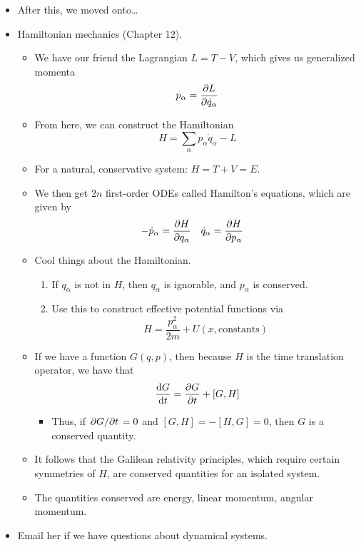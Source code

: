 \documentclass[../notes.tex]{subfiles}
\begin{document}
\begin{itemize}
\begin{itemize}
    \end{itemize}
    \item After this, we moved onto\dots
    \item Hamiltonian mechanics (Chapter 12).
    \begin{itemize}
        \item We have our friend the Lagrangian $L=T-V$, which gives us generalized momenta
        \begin{equation*}
            p_\alpha = \pdv{L}{\dot{q}_\alpha}
        \end{equation*}
        \item From here, we can construct the Hamiltonian
        \begin{equation*}
            H = \sum_\alpha p_\alpha\dot{q}_\alpha-L
        \end{equation*}
        \item For a natural, conservative system: $H=T+V=E$.
        \item We then get $2n$ first-order ODEs called Hamilton's equations, which are given by
        \begin{align*}
            -\dot{p}_\alpha &= \pdv{H}{q_\alpha}&
            \dot{q}_\alpha &= \pdv{H}{p_\alpha}
        \end{align*}
        \item Cool things about the Hamiltonian.
        \begin{enumerate}
            \item If $q_\alpha$ is not in $H$, then $q_\alpha$ is ignorable, and $p_\alpha$ is conserved.
            \item Use this to construct effective potential functions via
            \begin{equation*}
                H = \frac{p_\alpha^2}{2m}+U(x,\text{constants})
            \end{equation*}
        \end{enumerate}
        \item If we have a function $G(q,p)$, then because $H$ is the time translation operator, we have that
        \begin{equation*}
            \dv{G}{t} = \pdv{G}{t}+[G,H]
        \end{equation*}
        \begin{itemize}
            \item Thus, if $\pdv*{G}{t}=0$ and $[G,H]=-[H,G]=0$, then $G$ is a conserved quantity.
        \end{itemize}
        \item It follows that the Galilean relativity principles, which require certain symmetries of $H$, are conserved quantities for an isolated system.
        \item The quantities conserved are energy, linear momentum, angular momentum.
    \end{itemize}
    \item Email her if we have questions about dynamical systems.
\end{itemize}




\end{document}
